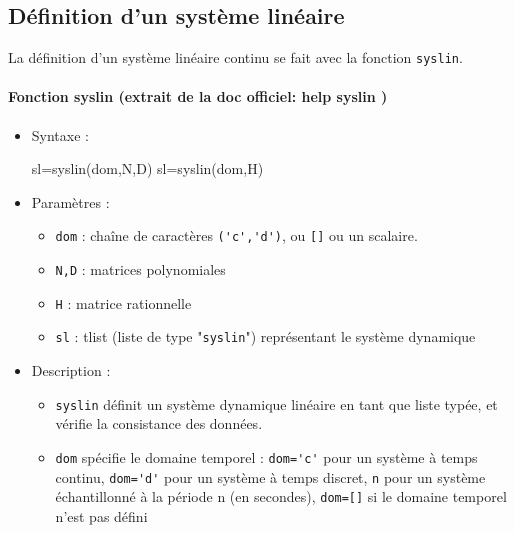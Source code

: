 \subsection{Définition d'un système linéaire}
La définition d'un système linéaire continu se fait avec la fonction 
\verb?syslin?. 

\begin{doc}
\paragraph{Fonction syslin (extrait de la doc officiel: help syslin )}
    \begin{itemize}
        \item Syntaxe :
        \begin{Scilabcode}
sl=syslin(dom,N,D)
sl=syslin(dom,H)
        \end{Scilabcode}
        \item Paramètres :
            \begin{itemize}
                \item \verb?dom? : chaîne de caractères \verb?('c','d')?, 
                      ou \verb?[]? ou un scalaire.
                \item \verb?N,D? : matrices polynomiales
                \item \verb?H?   : matrice rationnelle
                \item \verb?sl?  : tlist (liste de type "\verb?syslin?") 
                      représentant le système dynamique
            \end{itemize}
        \item Description : 
            \begin{itemize}
                \item \verb?syslin? définit un système dynamique linéaire en 
                      tant que liste typée, et vérifie la consistance des 
                      données.
                \item \verb?dom? spécifie le domaine temporel :
                      \verb?dom='c'? pour un système à temps continu, 
                      \verb?dom='d'? pour un système à temps discret, 
                      \verb?n? pour un système échantillonné à la période n 
                      (en secondes), 
                      \verb?dom=[]? si le domaine temporel n'est pas défini
            \end{itemize}
    \end{itemize}
\end{doc}
